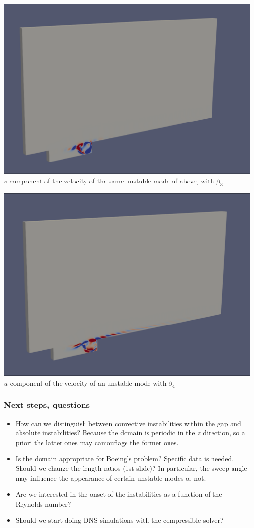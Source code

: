 \documentclass[
	aspectratio=169, %
	t, %
	onlytextwidth, %
	10pt, %
]{beamer}
\begin{document}
\begin{frame}

	\begin{center}
		\includegraphics[width=0.6\linewidth]{Images/mode3_v.png}\\[3pt]
		{\tiny\textcolor{ICLBlue}{$v$ component of the velocity of the same unstable mode of above, with $\beta_3$}}
	\end{center}


\end{frame}

\begin{frame}

	\begin{center}
		\includegraphics[width=0.6\linewidth]{Images/mode4_u.png}\\[3pt]
		{\tiny\textcolor{ICLBlue}{$u$ component of the velocity of an unstable mode with $\beta_4$}}
	\end{center}

\end{frame}

\begin{frame}
  \frametitle{Next steps, questions}

	\begin{itemize}
		\item How can we distinguish between convective instabilities within the gap and absolute instabilities? Because the domain is periodic in the $z$ direction, so a priori the latter ones may camouflage the former ones.
		\item Is the domain appropriate for Boeing's problem? Specific data is needed. Should we change the length ratios (1st slide)? In particular, the sweep angle may influence the appearance of certain unstable modes or not.
		\item Are we interested in the onset of the instabilities as a function of the Reynolds number?
		\item Should we start doing DNS simulations with the compressible solver?
	\end{itemize}
\end{frame}
\end{document}
